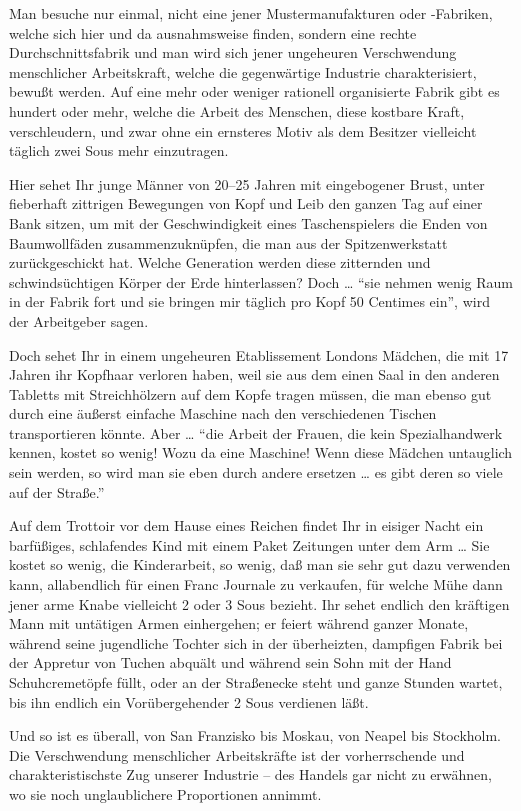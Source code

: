 \documentclass{scrbook}
\begin{document}
Man besuche nur einmal, nicht eine jener Mustermanufakturen oder -Fabriken, welche sich hier und da ausnahmsweise finden, sondern eine rechte Durchschnittsfabrik und man wird sich jener ungeheuren Verschwendung menschlicher Arbeitskraft, welche die gegenwärtige Industrie charakterisiert, bewußt werden. Auf eine mehr oder weniger rationell organisierte Fabrik gibt es hundert oder mehr, welche die Arbeit des Menschen, diese kostbare Kraft, verschleudern, und zwar ohne ein ernsteres Motiv als dem Besitzer vielleicht täglich zwei Sous mehr einzutragen.

Hier sehet Ihr junge Männer von 20–25 Jahren mit eingebogener Brust, unter fieberhaft zittrigen Bewegungen von Kopf und Leib den ganzen Tag auf einer Bank sitzen, um mit der Geschwindigkeit eines Taschenspielers die Enden von Baumwollfäden zusammenzuknüpfen, die man aus der Spitzenwerkstatt zurückgeschickt hat. Welche Generation werden diese zitternden und schwindsüchtigen Körper der Erde hinterlassen? Doch … ``sie nehmen wenig Raum in der Fabrik fort und sie bringen mir täglich pro Kopf 50 Centimes ein'', wird der Arbeitgeber sagen.

Doch sehet Ihr in einem ungeheuren Etablissement Londons Mädchen, die mit 17 Jahren ihr Kopfhaar verloren haben, weil sie aus dem einen Saal in den anderen Tabletts mit Streichhölzern auf dem Kopfe tragen müssen, die man ebenso gut durch eine äußerst einfache Maschine nach den verschiedenen Tischen transportieren könnte. Aber … ``die Arbeit der Frauen, die kein Spezialhandwerk kennen, kostet so wenig! Wozu da eine Maschine! Wenn diese Mädchen untauglich sein werden, so wird man sie eben durch andere ersetzen … es gibt deren so viele auf der Straße.''

Auf dem Trottoir vor dem Hause eines Reichen findet Ihr in eisiger Nacht ein barfüßiges, schlafendes Kind mit einem Paket Zeitungen unter dem Arm … Sie kostet so wenig, die Kinderarbeit, so wenig, daß man sie sehr gut dazu verwenden kann, allabendlich für einen Franc Journale zu verkaufen, für welche Mühe dann jener arme Knabe vielleicht 2 oder 3 Sous bezieht. Ihr sehet endlich den kräftigen Mann mit untätigen Armen einhergehen; er feiert während ganzer Monate, während seine jugendliche Tochter sich in der überheizten, dampfigen Fabrik bei der Appretur von Tuchen abquält und während sein Sohn mit der Hand Schuhcremetöpfe füllt, oder an der Straßenecke steht und ganze Stunden wartet, bis ihn endlich ein Vorübergehender 2 Sous verdienen läßt.

Und so ist es überall, von San Franzisko bis Moskau, von Neapel bis Stockholm. Die Verschwendung menschlicher Arbeitskräfte ist der vorherrschende und charakteristischste Zug unserer Industrie – des Handels gar nicht zu erwähnen, wo sie noch unglaublichere Proportionen annimmt.
\end{document}
